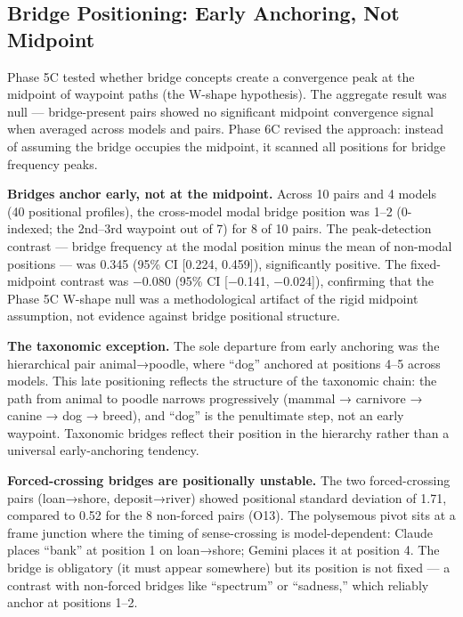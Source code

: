 \subsection{Bridge Positioning: Early Anchoring, Not Midpoint}\label{bridge-positioning-early-anchoring-not-midpoint}

Phase 5C tested whether bridge concepts create a convergence peak at the midpoint of waypoint paths (the W-shape hypothesis). The aggregate result was null --- bridge-present pairs showed no significant midpoint convergence signal when averaged across models and pairs. Phase 6C revised the approach: instead of assuming the bridge occupies the midpoint, it scanned all positions for bridge frequency peaks.

\textbf{Bridges anchor early, not at the midpoint.} Across 10 pairs and 4 models (40 positional profiles), the cross-model modal bridge position was 1--2 (0-indexed; the 2nd--3rd waypoint out of 7) for 8 of 10 pairs. The peak-detection contrast --- bridge frequency at the modal position minus the mean of non-modal positions --- was 0.345 (95\% CI {[}0.224, 0.459{]}), significantly positive. The fixed-midpoint contrast was −0.080 (95\% CI {[}−0.141, −0.024{]}), confirming that the Phase 5C W-shape null was a methodological artifact of the rigid midpoint assumption, not evidence against bridge positional structure.

\textbf{The taxonomic exception.} The sole departure from early anchoring was the hierarchical pair animal→poodle, where ``dog'' anchored at positions 4--5 across models. This late positioning reflects the structure of the taxonomic chain: the path from animal to poodle narrows progressively (mammal → carnivore → canine → dog → breed), and ``dog'' is the penultimate step, not an early waypoint. Taxonomic bridges reflect their position in the hierarchy rather than a universal early-anchoring tendency.

\textbf{Forced-crossing bridges are positionally unstable.} The two forced-crossing pairs (loan→shore, deposit→river) showed positional standard deviation of 1.71, compared to 0.52 for the 8 non-forced pairs (O13). The polysemous pivot sits at a frame junction where the timing of sense-crossing is model-dependent: Claude places ``bank'' at position 1 on loan→shore; Gemini places it at position 4. The bridge is obligatory (it must appear somewhere) but its position is not fixed --- a contrast with non-forced bridges like ``spectrum'' or ``sadness,'' which reliably anchor at positions 1--2.

